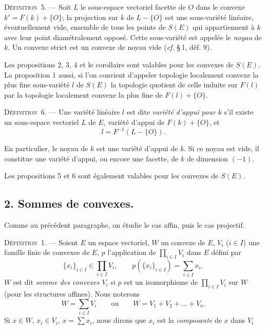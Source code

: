 \documentclass[11pt]{article}
\newcommand{\bzcf}[2]{#1}
\newcommand{\bznum}[1]{\if\relax\detokenize{#1}\relax\else\ #1\fi}
\newenvironment{defin}[1][]{\par\medskip\noindent\textsc{Définition\bznum{#1}.} --- }{\par\medskip}
\begin{document}
\begin{defin}[5]
Soit $L$ le sous-espace vectoriel facette de $O$ dans le convexe $k'=F(k)+\{O\}$; la projection
sur $k$ de $L-\{O\}$ est une sous-variété linéaire, éventuellement vide, ensemble de tous les
points de $S(E)$ qui appartiennent à $k$ avec leur point diamétralement opposé. Cette
sous-variété est appelée le \textit{noyau} de $k$. Un convexe strict est un convexe de noyau vide
(\bzcf{\textit{cf.} \S\,1, déf. 9}{\ref{bzdef:c1s1d9_convexe_strict}}).
\end{defin}

Les \bzcf{propositions 2}{\ref{bzprop:c3s1p2_alpha_support}},
\bzcf{3}{\ref{bzprop:c3s1p3_ordre_supports}}, \bzcf{4}{\ref{bzprop:c3s1p4_facettes_filtrant}}
et \bzcf{le corollaire}{\ref{bzcor:c3s1p4c_supports_filtrant}} sont valables pour les convexes de
$S(E)$. \bzcf{La proposition 1}{\ref{bzprop:c3s1p1_facette_ouverte}} aussi, si l'on convient
d'appeler topologie localement convexe la plus fine sous-variété $l$ de $S(E)$ la topologie
quotient de celle induite sur $F(l)$ par la topologie localement convexe la plus fine de
$F(l)+\{O\}$.

\begin{defin}[6]
Une variété linéaire $l$ est dite \textit{variété d'appui pour $k$} s'il existe un sous-espace
vectoriel $L$ de $E$, variété d'appui de $F(k)+\{O\}$, et
\[ l=F^{-1}(L-\{O\}). \]
\end{defin}

En particulier, le noyau de $k$ est une variété d'appui de $k$. Si ce noyau est vide, il
constitue une variété d'appui, ou encore une facette, de $k$ de dimension $(-1)$.

Les \bzcf{propositions 5}{\ref{bzprop:c3s1p5_appui_facette_dim_finie}} et
\bzcf{6}{\ref{bzprop:c3s1p6_alpha_induit}} sont également valables pour les convexes de $S(E)$.

\subsection*{2. Sommes de convexes.}

Comme au précédent paragraphe, on étudie le cas affin, puis le cas projectif.

\begin{defin}[1]
Soient $E$ un espace vectoriel, $W$ un convexe de $E$, $V_i$ ($i\in I$) une famille finie de
convexes de $E$, $p$ l'application de $\prod_{i\in I}V_i$ dans $E$ défini par
\[ \{x_i\}_{i\in I}\in\prod_{i\in I}V_i,\qquad p(\{x_i\}_{i\in I})=\sum_{i\in I}x_i, \]
$W$ est dit \textit{somme des convexes $V_i$} si $p$ est un isomorphisme de $\prod_{i\in I}V_i$
sur $W$ (pour les structures affines). Nous noterons
\[ W=\sum_{i\in I}V_i\qquad\text{ou}\qquad W=V_1+V_2+\ldots+V_n. \]
Si $x\in W$, $x_i\in V_i$, $x=\sum x_i$, nous dirons que $x_i$ est la \textit{composante} de $x$
dans $V_i$
\end{defin}
\end{document}
